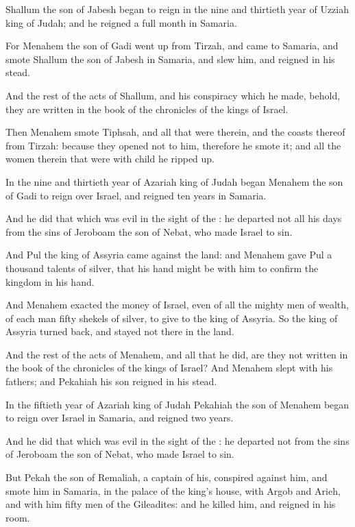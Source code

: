 \verse Shallum the son of Jabesh began to reign in the nine and thirtieth year of Uzziah king of Judah; and he reigned a full month in Samaria.

\verse For Menahem the son of Gadi went up from Tirzah, and came to Samaria, and smote Shallum the son of Jabesh in Samaria, and slew him, and reigned in his stead.

\verse And the rest of the acts of Shallum, and his conspiracy which he made, behold, they are written in the book of the chronicles of the kings of Israel.

\verse Then Menahem smote Tiphsah, and all that were therein, and the coasts thereof from Tirzah: because they opened not to him, therefore he smote it; and all the women therein that were with child he ripped up.

\verse In the nine and thirtieth year of Azariah king of Judah began Menahem the son of Gadi to reign over Israel, and reigned ten years in Samaria.

\verse And he did that which was evil in the sight of the \LORD: he departed not all his days from the sins of Jeroboam the son of Nebat, who made Israel to sin.

\verse And Pul the king of Assyria came against the land: and Menahem gave Pul a thousand talents of silver, that his hand might be with him to confirm the kingdom in his hand.

\verse And Menahem exacted the money of Israel, even of all the mighty men of wealth, of each man fifty shekels of silver, to give to the king of Assyria. So the king of Assyria turned back, and stayed not there in the land.

\verse And the rest of the acts of Menahem, and all that he did, are they not written in the book of the chronicles of the kings of Israel?  \verse And Menahem slept with his fathers; and Pekahiah his son reigned in his stead.

\verse In the fiftieth year of Azariah king of Judah Pekahiah the son of Menahem began to reign over Israel in Samaria, and reigned two years.

\verse And he did that which was evil in the sight of the \LORD: he departed not from the sins of Jeroboam the son of Nebat, who made Israel to sin.

\verse But Pekah the son of Remaliah, a captain of his, conspired against him, and smote him in Samaria, in the palace of the king's house, with Argob and Arieh, and with him fifty men of the Gileadites: and he killed him, and reigned in his room.

